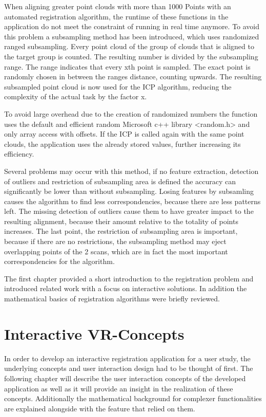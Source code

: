 \documentclass[hyperref,english,bachelorofscience,bibnum,twoside]{cgvpub}
\begin{document}
When aligning greater point clouds with more than 1000 Points with an automated registration algorithm, the runtime of these functions in the application do not meet the constraint of running in real time anymore. 
To avoid this problem a subsampling method has been introduced, which uses randomized ranged subsampling. Every point cloud of the group of clouds that is aligned to the target group is counted. The resulting number is divided by the subsampling range. The range indicates that every xth point is sampled. The exact point is randomly chosen in between the ranges distance, counting upwards. The resulting subsampled point cloud is now used for the ICP algorithm, reducing the complexity of the actual task by the factor x.

To avoid large overhead due to the creation of randomized numbers the function uses the default and efficient random Microsoft c++ library <random.h> and only array access with offsets. If the ICP is called again with the same point clouds, the application uses the already stored values, further increasing its efficiency.

Several problems may occur with this method, if no feature extraction, detection of outliers and restriction of subsampling area is defined the accuracy can significantly be lower than without subsampling. Losing features by subsamling causes the algorithm to find less correspondencies, because there are less patterns left. The missing detection of outliers cause them to have greater impact to the resulting alignment, because their amount relative to the totality of points increases. The last point, the restriction of subsampling area is important, because if there are no restrictions, the subsampling method may eject overlapping points of the 2 scans, which are in fact the most important correspondencies for the algorithm. 

The first chapter provided a short introduction to the registration problem and introduced related work with a focus on interactive solutions. In addition the mathematical basics of registration algorithms were briefly reviewed. 

\chapter{Interactive VR-Concepts}

In order to develop an interactive registration application for a user study, the underlying concepts and user interaction design had to be thought of first. The following chapter will describe the user interaction concepts of the developed application as well as it will provide an insight in the realization of these concepts. Additionally the mathematical background for complexer functionalities are explained alongside with the feature that relied on them.
\end{document}
